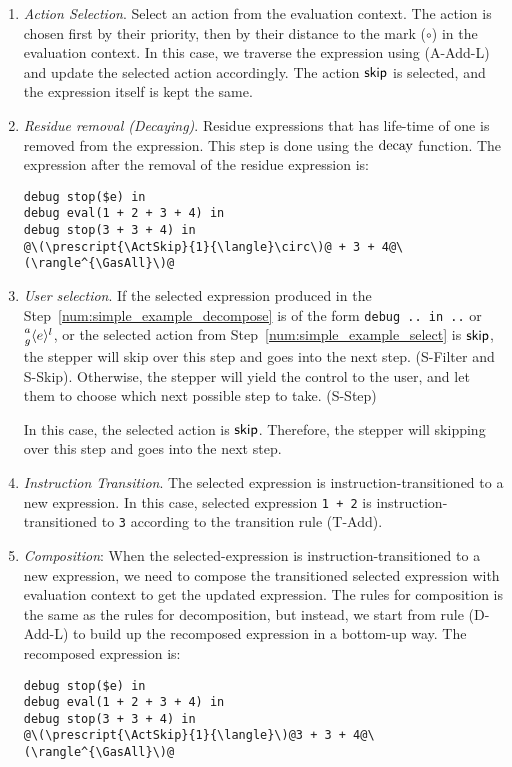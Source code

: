\begin{enumerate}
\item \emph{Action Selection}. \label{num:simple_example_select}
  Select an action from the evaluation context. The action is chosen
  first by their priority, then by their distance to the mark
  (\(\circ\)) in the evaluation context. In this case, we traverse
  the expression using (A-Add-L) and update the selected action
  accordingly. The action \(\ActSkip\) is selected, and the expression
  itself is kept the same.

\item \emph{Residue removal (Decaying)}. Residue expressions that
  has life-time of one is removed from the expression. This step is
  done using the \(\Decay\) function. The expression after the removal
  of the residue expression is:
  \begin{lstlisting}[language=hazel,caption={Evaluation context after decaying},label={lst:simple_example_decay}]
debug stop($e) in
debug eval(1 + 2 + 3 + 4) in
debug stop(3 + 3 + 4) in
@\(\prescript{\ActSkip}{1}{\langle}\circ\)@ + 3 + 4@\(\rangle^{\GasAll}\)@\end{lstlisting}

\item \emph{User selection}. If the selected expression produced in
  the Step~\ref{num:simple_example_decompose} is of the form
  \lstinline[language=hazel]{debug .. in ..} or
  \(\Residue{a}{g}{l}{e}\), or the selected action from
  Step~\ref{num:simple_example_select} is \(\ActSkip\), the stepper
  will skip over this step and goes into the next step. (S-Filter and
  S-Skip). Otherwise, the stepper will yield the control to the user,
  and let them to choose which next possible step to take. (S-Step)

  In this case, the selected action is \(\ActSkip\). Therefore, the stepper
  will skipping over this step and goes into the next step.

\item \emph{Instruction Transition}. The selected expression is
  instruction-transitioned to a new expression. In this case, selected
  expression \lstinline[language=hazel]{1 + 2} is
  instruction-transitioned to \lstinline[language=hazel]{3} according
  to the transition rule (T-Add).

\item \emph{Composition}: When the selected-expression is
  instruction-transitioned to a new expression, we need to compose the
  transitioned selected expression with evaluation context to get the
  updated expression. The rules for composition is the same as the
  rules for decomposition, but instead, we start from rule (D-Add-L)
  to build up the recomposed expression in a bottom-up way. The
  recomposed expression is:
  \begin{lstlisting}[language=hazel]
debug stop($e) in
debug eval(1 + 2 + 3 + 4) in
debug stop(3 + 3 + 4) in
@\(\prescript{\ActSkip}{1}{\langle}\)@3 + 3 + 4@\(\rangle^{\GasAll}\)@\end{lstlisting}


\end{enumerate}
